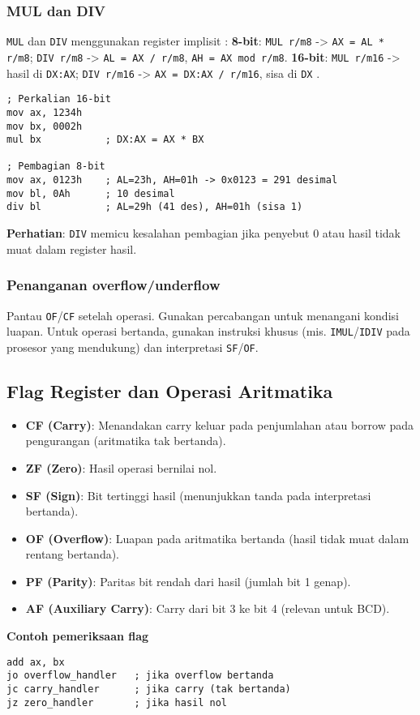 \subsubsection{MUL dan DIV}
\texttt{MUL} dan \texttt{DIV} menggunakan register implisit \cite{hyde2010art}:\newline
\textbf{8-bit}: \texttt{MUL r/m8} -> \texttt{AX = AL * r/m8}; \texttt{DIV r/m8} -> \texttt{AL = AX / r/m8}, \texttt{AH = AX mod r/m8}.\newline
\textbf{16-bit}: \texttt{MUL r/m16} -> hasil di \texttt{DX:AX}; \texttt{DIV r/m16} -> \texttt{AX = DX:AX / r/m16}, sisa di \texttt{DX} \cite{susanto1995belajar}.
\begin{verbatim}
; Perkalian 16-bit
mov ax, 1234h
mov bx, 0002h
mul bx           ; DX:AX = AX * BX

; Pembagian 8-bit
mov ax, 0123h    ; AL=23h, AH=01h -> 0x0123 = 291 desimal
mov bl, 0Ah      ; 10 desimal
div bl           ; AL=29h (41 des), AH=01h (sisa 1)
\end{verbatim}
\textbf{Perhatian}: \texttt{DIV} memicu kesalahan pembagian jika penyebut 0 atau hasil tidak muat dalam register hasil.

\subsubsection{Penanganan overflow/underflow}
Pantau \texttt{OF}/\texttt{CF} setelah operasi. Gunakan percabangan untuk menangani kondisi luapan. Untuk operasi bertanda, gunakan instruksi khusus (mis. \texttt{IMUL}/\texttt{IDIV} pada prosesor yang mendukung) dan interpretasi \texttt{SF}/\texttt{OF}.

\subsection{Flag Register dan Operasi Aritmatika}
\begin{itemize}
  \item \textbf{CF (Carry)}: Menandakan carry keluar pada penjumlahan atau borrow pada pengurangan (aritmatika tak bertanda).
  \item \textbf{ZF (Zero)}: Hasil operasi bernilai nol.
  \item \textbf{SF (Sign)}: Bit tertinggi hasil (menunjukkan tanda pada interpretasi bertanda).
  \item \textbf{OF (Overflow)}: Luapan pada aritmatika bertanda (hasil tidak muat dalam rentang bertanda).
  \item \textbf{PF (Parity)}: Paritas bit rendah dari hasil (jumlah bit 1 genap).
  \item \textbf{AF (Auxiliary Carry)}: Carry dari bit 3 ke bit 4 (relevan untuk BCD).
\end{itemize}
\noindent\textbf{Contoh pemeriksaan flag}
\begin{verbatim}
add ax, bx
jo overflow_handler   ; jika overflow bertanda
jc carry_handler      ; jika carry (tak bertanda)
jz zero_handler       ; jika hasil nol
\end{verbatim}

